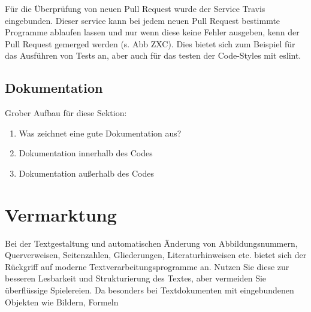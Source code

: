 Für die Überprüfung von neuen Pull Request wurde der Service Travis eingebunden. Dieser service kann bei jedem neuen Pull Request bestimmte Programme ablaufen lassen und nur wenn diese keine Fehler ausgeben, kenn der Pull Request gemerged werden (s. Abb ZXC). Dies bietet sich zum Beispiel für das Ausführen von Tests an, aber auch für das testen der Code-Styles mit eslint.

\subsection{Dokumentation}
Grober Aufbau für diese Sektion:

\begin{enumerate}
  \item Was zeichnet eine gute Dokumentation aus?
  \item Dokumentation innerhalb des Codes
  \item Dokumentation außerhalb des Codes
\end{enumerate}

\section{Vermarktung}
Bei der Textgestaltung und automatischen Änderung von Abbildungsnummern, Querverweisen,
Seitenzahlen, Gliederungen, Literaturhinweisen etc. bietet sich der Rückgriff
auf moderne Textverarbeitungsprogramme an. Nutzen Sie diese zur besseren Lesbarkeit
und Strukturierung des Textes, aber vermeiden Sie überflüssige Spielereien. Da
besonders bei Textdokumenten mit eingebundenen Objekten wie Bildern, Formeln
